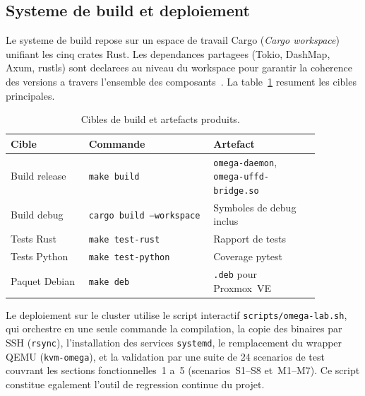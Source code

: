 \subsection{Systeme de build et deploiement}
\label{subsec:impl-build}

Le systeme de build repose sur un espace de travail Cargo (\textit{Cargo workspace}) unifiant les cinq crates Rust. Les dependances partagees (Tokio, DashMap, Axum, rustls) sont declarees au niveau du workspace pour garantir la coherence des versions a travers l'ensemble des composants~\cite{rust_lang}. La table~\ref{tab:build-cibles} resument les cibles principales.

\begin{table}[htbp]
    \centering
    \caption{Cibles de build et artefacts produits.}
    \label{tab:build-cibles}
    \begin{tabular}{p{0.22\linewidth} p{0.35\linewidth} p{0.30\linewidth}}
        \toprule
        \textbf{Cible} & \textbf{Commande} & \textbf{Artefact} \\
        \midrule
        Build release & \texttt{make build} & \texttt{omega-daemon}, \texttt{omega-uffd-bridge.so} \\
        Build debug & \texttt{cargo build --workspace} & Symboles de debug inclus \\
        Tests Rust & \texttt{make test-rust} & Rapport de tests \\
        Tests Python & \texttt{make test-python} & Coverage pytest \\
        Paquet Debian & \texttt{make deb} & \texttt{.deb} pour Proxmox~VE \\
        \bottomrule
    \end{tabular}
\end{table}

Le deploiement sur le cluster utilise le script interactif \texttt{scripts/omega-lab.sh}, qui orchestre en une seule commande la compilation, la copie des binaires par SSH (\texttt{rsync}), l'installation des services \texttt{systemd}, le remplacement du wrapper QEMU (\texttt{kvm-omega}), et la validation par une suite de 24 scenarios de test couvrant les sections fonctionnelles~1 a~5 (scenarios~S1--S8 et~M1--M7). Ce script constitue egalement l'outil de regression continue du projet.


